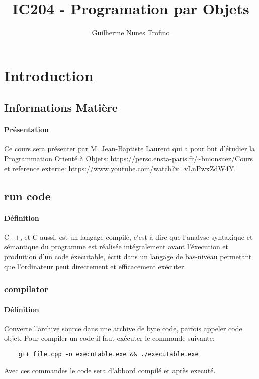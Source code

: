 \documentclass{article}
\title{IC204 - Programation par Objets}
\author{Guilherme Nunes Trofino}
\begin{document}
\maketitle

\newpage\tableofcontents

\section{Introduction}

% 


\subsection{Informations Matière}
\paragraph{Présentation}Ce cours sera présenter par M. Jean-Baptiste Laurent qui a pour but d'étudier la Programmation Orienté à Objets: \url{https://perso.ensta-paris.fr/~bmonsuez/Cours} et reference externe: \url{https://www.youtube.com/watch?v=vLnPwxZdW4Y}.

\subsection{run code}
\paragraph{Définition}C++, et C aussi, est un langage compilé, c'est-à-dire que l'analyse syntaxique et sémantique du programme est réalisée intégralement avant l'éxecution et produition d'un code éxecutable, écrit dans un langage de bas-niveau permetant que l'ordinateur peut directement et efficacement exécuter.\\

\subsubsection{compilator}
\paragraph{Définition}Converte l'archive source dans une archive de byte code, parfois appeler code objet. Pour compiler un code il faut exécuter le commande suivante:
\begin{scriptsize}
    \mycode
    \begin{lstlisting}
    g++ file.cpp -o executable.exe && ./executable.exe
    \end{lstlisting}
\end{scriptsize}
Avec ces commandes le code sera d'abbord compilé et après executé.
\end{document}
